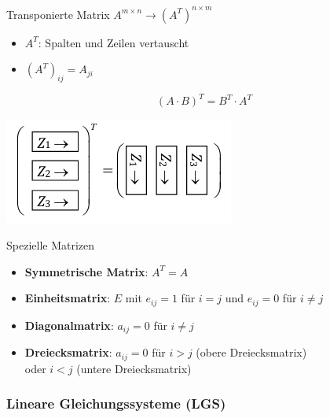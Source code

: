     \begin{minipage}{0.65\linewidth}
        \begin{definition}{Transponierte Matrix} $A^{m \times n} \rightarrow (A^T)^{n \times m}$
            \begin{itemize}
                \item $A^T$: Spalten und Zeilen vertauscht
                \item $(A^T)_{ij} = A_{ji}$
            \end{itemize}
            \vspace{2mm}
            $${(A\cdot B)}^T = B^T\cdot A^T$$
        \end{definition}
    \end{minipage}
    \begin{minipage}{0.35\linewidth}
        \includegraphics[width=1\linewidth]{mat-transpos.png}
    \end{minipage}

    \begin{KR}{Spezielle Matrizen}
        \begin{itemize}
            \item \textbf{Symmetrische Matrix}: $A^T = A$
            \item \textbf{Einheitsmatrix}: $E$ mit $e_{ij} = 1$ für $i = j$ und $e_{ij} = 0$ für $i \neq j$
            \item \textbf{Diagonalmatrix}: $a_{ij} = 0$ für $i \neq j$
            \item \textbf{Dreiecksmatrix}: $a_{ij} = 0$ für $i > j$ (obere Dreiecksmatrix) \\oder $i < j$ (untere Dreiecksmatrix)
        \end{itemize}
    \end{KR}

\raggedcolumns
\columnbreak

\subsubsection*{Lineare Gleichungssysteme (LGS)}
    
